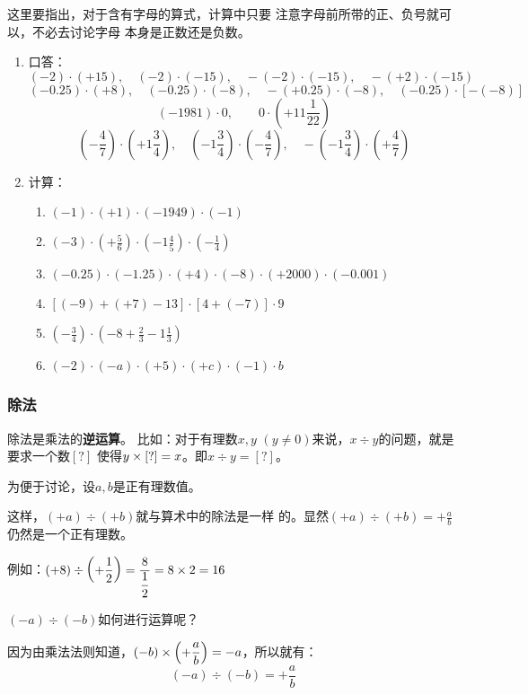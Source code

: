 这里要指出，对于含有字母的算式，计算中只要
注意字母前所带的正、负号就可以，不必去讨论字母
本身是正数还是负数。

\begin{ex}
	\begin{enumerate}
		\item 口答：
		\[(-2)\cdot (+15),\quad (-2)\cdot (-15),\quad -(-2)\cdot (-15),\quad -(+2)\cdot (-15)\]
		\[(-0.25)\cdot (+8),\quad (-0.25)\cdot (-8),\quad -(+0.25)\cdot (-8),\quad(-0.25)\cdot [-(-8)] \]
		\[(-1981)\cdot 0,\qquad 0\cdot\left(+11\frac{1}{22}\right)\]
		\[\left(-\frac{4}{7}\right)\cdot \left(+1\frac{3}{4}\right),\quad \left(-1\frac{3}{4}\right)\cdot\left(-\frac{4}{7}\right),\quad -\left(-1\frac{3}{4}\right)\cdot\left(+\frac{4}{7}\right)\]
		
		\item 计算：
		\begin{enumerate}
			\item $(-1)\cdot(+1)\cdot (-1949)\cdot (-1)$
			\item $(-3)\cdot \left(+\frac{5}{6}\right)\cdot \left(-1\frac{4}{5}\right)\cdot\left(-\frac{1}{4}\right)$
			\item $(-0.25)\cdot (-1.25)\cdot (+4)\cdot (-8)\cdot (+2000)\cdot (-0.001)$
			\item $[(-9)+(+7)-13]\cdot [4+(-7)]\cdot 9$
			\item $\left(-\frac{3}{4}\right)\cdot \left(-8+\frac{2}{3}-1\frac{1}{3}\right)$
			\item $(-2)\cdot (-a)\cdot (+5)\cdot (+c)\cdot (-1)\cdot b$
		\end{enumerate}
	\end{enumerate}    
\end{ex}

\subsubsection{除法}
除法是乘法的\textbf{逆运算}。 比如：对于有理数$x,  y$
$(y\ne 0)$来说，$x\div y$的问题，就是要求一个数$[?]$
使得$y\times[?]=x$。即$x\div y=[?]$。

为便于讨论，设$a,b$是正有理数值。

这样，$(+a) \div (+b)$就与算术中的除法是一样
的。显然$(+a)\div (+b)=+\frac{a}{b}$仍然是一个正有理数。

例如：$(+8)\div\left(+\dfrac{1}{2}\right)=\dfrac{8}{\dfrac{1}{2}}=8\times 2=16$

$(-a) \div (-b)$如何进行运算呢？

因为由乘法法则知道，$(-b)\times \left(+\dfrac{a}{b}\right)=-a$，所以就有：
\[(-a) \div (-b)=+\frac{a}{b}\]

